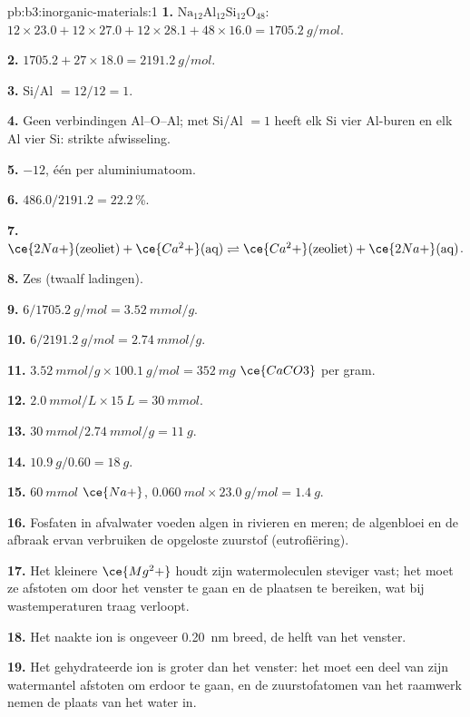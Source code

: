 \begin{solution}{pb:b3:inorganic-materials:1}
\textbf{1.} $\mathrm{Na_{12}Al_{12}Si_{12}O_{48}}$: $12 \times 23.0 + 12 \times 27.0 + 12 \times 28.1 + 48 \times 16.0 = \qty{1705.2}{g/mol}$.

\textbf{2.} $1705.2 + 27 \times 18.0 = \qty{2191.2}{g/mol}$.

\textbf{3.} Si/Al $= 12/12 = 1$.

\textbf{4.} Geen verbindingen Al--O--Al; met Si/Al $= 1$ heeft elk Si vier Al-buren en elk
Al vier Si: strikte afwisseling.

\textbf{5.} $-12$, één per aluminiumatoom.

\textbf{6.} $486.0/2191.2 = 22.2$\,\%.

\textbf{7.} $\ce{2Na+}(\text{zeoliet}) + \ce{Ca^2+}(\text{aq}) \rightleftharpoons \ce{Ca^2+}(\text{zeoliet}) + \ce{2Na+}(\text{aq})$.

\textbf{8.} Zes (twaalf ladingen).

\textbf{9.} $6/\qty{1705.2}{g/mol} = \qty{3.52}{mmol/g}$.

\textbf{10.} $6/\qty{2191.2}{g/mol} = \qty{2.74}{mmol/g}$.

\textbf{11.} $\qty{3.52}{mmol/g} \times \qty{100.1}{g/mol} = \qty{352}{mg}$ $\ce{CaCO3}$ per gram.

\textbf{12.} $\qty{2.0}{mmol/L} \times \qty{15}{L} = \qty{30}{mmol}$.

\textbf{13.} $\qty{30}{mmol}/\qty{2.74}{mmol/g} = \qty{11}{g}$.

\textbf{14.} $\qty{10.9}{g}/0.60 = \qty{18}{g}$.

\textbf{15.} $\qty{60}{mmol}$ $\ce{Na+}$, $\qty{0.060}{mol} \times \qty{23.0}{g/mol} = \qty{1.4}{g}$.

\textbf{16.} Fosfaten in afvalwater voeden algen in rivieren en meren; de
algenbloei en de afbraak ervan verbruiken de opgeloste zuurstof
(eutrofiëring).

\textbf{17.} Het kleinere $\ce{Mg^2+}$ houdt zijn watermoleculen steviger vast; het moet ze afstoten
om door het venster te gaan en de plaatsen te bereiken, wat bij
wastemperaturen traag verloopt.

\textbf{18.} Het naakte ion is ongeveer \qty{0.20}{nm} breed, de helft van het venster.

\textbf{19.} Het gehydrateerde ion is groter dan het venster: het moet een
deel van zijn watermantel afstoten om erdoor te gaan, en de
zuurstofatomen van het raamwerk nemen de plaats van het water in.


\end{solution}
